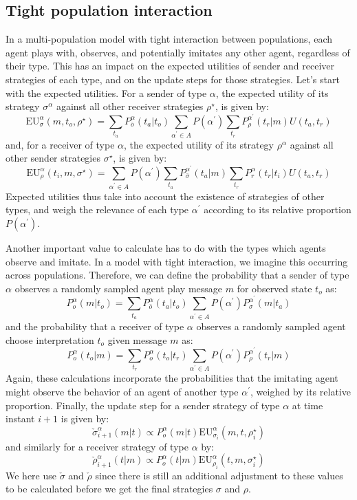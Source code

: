 \documentclass[a4paper]{article}
\begin{document}
\subsection{Tight population interaction}
\label{sec:tight-interaction-model}
In a multi-population model with tight interaction between populations, each agent plays with, observes, and potentially imitates any other agent, regardless of their type.
This has an impact on the expected utilities of sender and receiver strategies of each type, and on the update steps for those strategies.
Let's start with the expected utilities.
For a sender of type $\alpha$, the expected utility of its strategy $\sigma^\alpha$ against all other receiver strategies $\rho^\star$, is given by:
$$
\text{EU}_{\sigma}^{\alpha}(m,t_{o},\rho^{\star})=\sum_{t_{a}}P_{\bar{o}}^{\alpha}(t_{a}|t_{o})\sum_{\alpha^{\prime}\in A}P(\alpha^{\prime})\sum_{t_{r}}P_{\rho}^{\alpha^{\prime}}(t_{r}|m)U(t_{a},t_{r})
$$
and, for a receiver of type $\alpha$, the expected utility of its strategy $\rho^\alpha$ against all other sender strategies $\sigma^\star$, is given by:
$$
\text{EU}_{\rho}^{\alpha}(t_{i},m,\sigma^{\star})=\sum_{\alpha^{\prime}\in A}P(\alpha^{\prime})\sum_{t_{a}}P_{\bar{\sigma}}^{\alpha^{\prime}}(t_{a}|m)\sum_{t_{r}}P_{r}^{\alpha}(t_{r}|t_{i})U(t_{a},t_{r})
$$
Expected utilities thus take into account the existence of strategies of other types, and weigh the relevance of each type $\alpha^\prime$ according to its relative proportion $P(\alpha^\prime)$.

Another important value to calculate has to do with the types which agents observe and imitate.
In a model with tight interaction, we imagine this occurring across populations.
Therefore, we can define the probability that a sender of type $\alpha$ observes a randomly sampled agent play message $m$ for observed state $t_o$ as:
$$
P_{o}^{\alpha}(m|t_{o})=\sum_{t_{a}}P_{\bar{o}}^{\alpha}(t_{a}|t_{o})\sum_{\alpha^{\prime}\in A}P(\alpha^{\prime})P_{\sigma}^{\alpha^{\prime}}(m|t_{a})
$$
and the probability that a receiver of type $\alpha$ observes a randomly sampled agent choose interpretation $t_o$ given message $m$ as:
$$
P_{o}^{\alpha}(t_{o}|m)=\sum_{t_{r}}P_{o}^{\alpha}(t_{o}|t_{r})\sum_{\alpha^{\prime}\in A}P(\alpha^{\prime})P_{\rho}^{\alpha^{\prime}}(t_{r}|m)
$$
Again, these calculations incorporate the probabilities that the imitating agent might observe the behavior of an agent of another type $\alpha^\prime$, weighed by its relative proportion.
%
Finally, the update step for a sender strategy of type $\alpha$ at time instant $i+1$ is given by:
$$
\check{\sigma}_{i+1}^{\alpha}(m|t) \propto P_{o}^{\alpha}(m|t)\text{EU}_{\sigma_{i}}^{\alpha}(m,t,\rho_{i}^{\star})
$$
and similarly for a receiver strategy of type $\alpha$ by:
$$
\check{\rho}_{i+1}^{\alpha}(t|m) \propto P_{o}^{\alpha}(t|m)\text{EU}_{\rho_{i}}^{\alpha}(t,m,\sigma_{i}^{\star})
$$
We here use $\check{\sigma}$ and $\check{\rho}$ since there is still an additional adjustment to these values to be calculated before we get the final strategies $\sigma$ and $\rho$.
\end{document}
